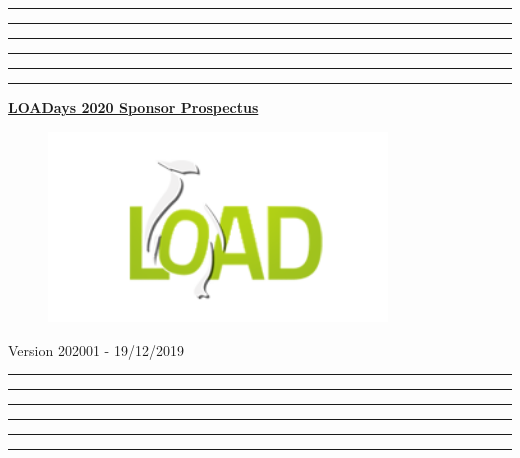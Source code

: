 \documentclass[a4paper,12pt]{article}
\begin{document}
\makeatletter
\renewcommand{\maketitle}{
    \begin{titlepage}
        \thispagestyle{empty}
        \pagenumbering{empty}
        \begin{center}
            \hrule\hrule\hrule\hrule\hrule\hrule
            \vspace{2.5cm}
            \Large{\underline{\textbf{LOADays 2020 Sponsor Prospectus}}}\\
        \end{center}
        \begin{figure}[h!]
            \centering
            \includegraphics[width=9cm]{images/loadays.png}
        \end{figure}
        \begin{center}
            \vspace{3.5cm}
            \scriptsize{Version 202001 - 19/12/2019}
            \hrule\hrule\hrule\hrule\hrule\hrule
        \end{center}
    \end{titlepage}
}
\maketitle

\pagestyle{fancy}
\setcounter{page}{1}
\fancyhead{}
\fancyhead[C]{}
\fancyfoot{}
\fancyfoot[C]{\bfseries\thepage}

%
\def\confdates{28th and 29th March 2020}

%

\end{document}
